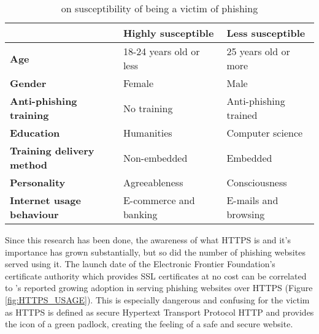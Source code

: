 \begin{table}[b]
	\begin{center}
		\begin{tabular}{ | m{12em} | m{12em} | m{11.5em} | }
			\hline
			                                  & \textbf{Highly susceptible} & \textbf{Less susceptible} \\ [1.25em]
			\hline
			\textbf{Age}                      & 18-24 years old or less     & 25 years old or more      \\
			\hline

			\textbf{Gender}                   & Female                      & Male                      \\
			\hline

			\textbf{Anti-phishing training}   & No training                 & Anti-phishing trained     \\
			\hline

			\textbf{Education}                & Humanities                  & Computer science          \\
			\hline

			\textbf{Training delivery method} & Non-embedded                & Embedded                  \\
			\hline

			\textbf{Personality}              & Agreeableness               & Consciousness             \\
			\hline

			\textbf{Internet usage behaviour} & E-commerce and banking      & E-mails and browsing      \\
			\hline
		\end{tabular}
		\caption{\cite{UNDERSTANDING_PHISHING_VICTIM} on susceptibility of being a victim of phishing}
		\label{tab:VICTIM_SUSCEPTIBILITY_BREAKDOWN}
	\end{center}
\end{table}

Since this research has been done, the awareness of what \gls{HTTPS} is and it's
importance has grown substantially, but so did the number of phishing websites
served using it. The launch date of the Electronic Frontier Foundation's
\citep{EFF_LETS_ENCRYPT} certificate authority which provides \gls{SSL} certificates
at no cost can be correlated to \cite{APWG_Q42019}'s reported growing adoption
in serving phishing websites over HTTPS (Figure \ref{fig:HTTPS_USAGE}). This is
especially dangerous and confusing for the victim as \gls{HTTPS} is defined as
secure Hypertext Transport Protocol \gls{HTTP} and provides the icon of a green padlock, creating the feeling of a safe and secure website.

